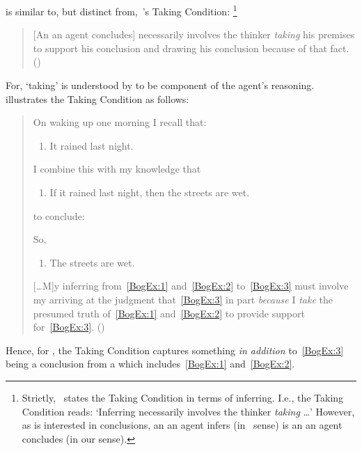 \begin{note}
  \supportI{} is similar to, but distinct from,~\citeauthor{Boghossian:2014aa}'s Taking Condition:%
  \footnote{
    Strictly,~\citeauthor{Boghossian:2014aa} states the Taking Condition in terms of inferring.
    I.e., the Taking Condition reads: `Inferring necessarily involves the thinker \emph{taking} \dots'
    However, as \citeauthor{Boghossian:2008vf} is interested in conclusions, an  an agent infers (in~\citeauthor{Boghossian:2014aa} sense) is an  an agent concludes (in our sense).
  }

  \begin{quote}
    [An  an agent concludes] necessarily involves the thinker \emph{taking} his premises to support his conclusion and drawing his conclusion because of that fact.%
    \mbox{}\hfill\mbox{(\citeyear[5]{Boghossian:2014aa})}
  \end{quote}

  \noindent%
  For, `taking' is understood by \citeauthor{Boghossian:2014aa} to be component of the agent's reasoning.
  \citeauthor{Boghossian:2014aa} illustrates the Taking Condition as follows:
  \begin{quote}
    On waking up one morning I recall that:

    \begin{enumerate}[label=(\arabic*), ref=(\arabic*), series=BogEx]
    \item
      \label{BogEx:1}
      It rained last night.
    \end{enumerate}

    I combine this with my knowledge that

    \begin{enumerate}[label=(\arabic*), ref=(\arabic*), resume*=BogEx]
    \item
      \label{BogEx:2}
      If it rained last night, then the streets are wet.
    \end{enumerate}

    to conclude:

    So,

    \begin{enumerate}[label=(\arabic*), ref=(\arabic*), resume*=BogEx]
    \item
      \label{BogEx:3}
      The streets are wet.
    \end{enumerate}

    [\dots M]y inferring from~\ref{BogEx:1} and~\ref{BogEx:2} to~\ref{BogEx:3} must involve my arriving at the judgment that~\ref{BogEx:3} in part \emph{because} I \emph{take} the presumed truth of~\ref{BogEx:1} and~\ref{BogEx:2} to provide support for~\ref{BogEx:3}.%
    \mbox{}\hfill\mbox{(\citeyear[2,4]{Boghossian:2014aa})}
  \end{quote}
  Hence, for \citeauthor{Boghossian:2014aa}, the Taking Condition captures something \emph{in addition} to~\ref{BogEx:3} being a conclusion from a \pool{} which includes~\ref{BogEx:1} and~\ref{BogEx:2}.


\end{note}
